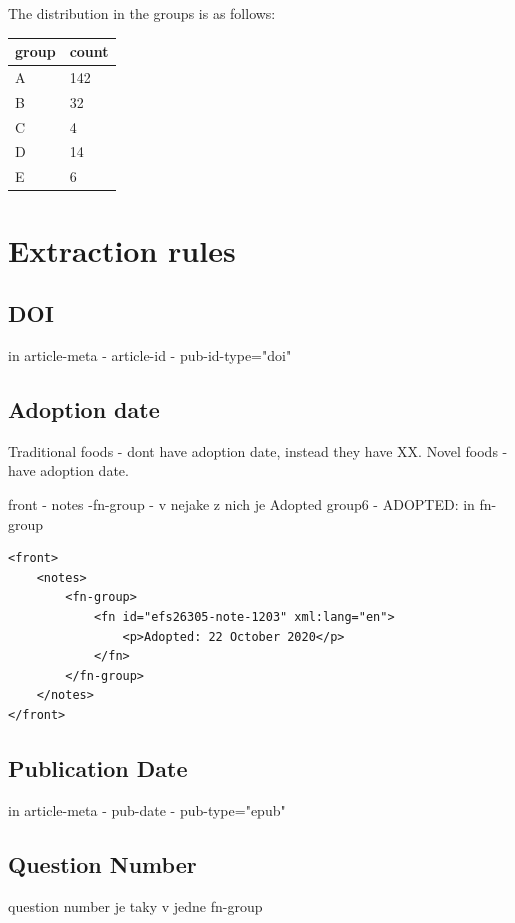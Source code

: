 \documentclass[12pt]{article}
\begin{document}
The distribution in the groups is as follows:

\begin{center}
    \begin{tabular}{| l | l |}
    \hline
    \textbf{group} & \textbf{count} \\
    \hline
    A & 142 \\ 
    B & 32 \\  
    C & 4 \\
    D & 14 \\
    E & 6 \\
    \hline
    \end{tabular}
\end{center}

\section{Extraction rules}

\subsection{DOI}
in article-meta - article-id - pub-id-type="doi"

\subsection{Adoption date}
Traditional foods - dont have adoption date, instead they have XX.
Novel foods - have adoption date.

front - notes -fn-group - v nejake z nich je Adopted
group6 - ADOPTED: in fn-group 
\lstset{language=XML, basicstyle=\footnotesize}
\begin{lstlisting}
<front>
    <notes>
        <fn-group>
            <fn id="efs26305-note-1203" xml:lang="en">
                <p>Adopted: 22 October 2020</p>
            </fn>
        </fn-group>
    </notes>
</front>
\end{lstlisting}

\subsection{Publication Date}
in article-meta - pub-date - pub-type="epub"

\subsection{Question Number}

question number je taky v jedne fn-group
\end{document}
